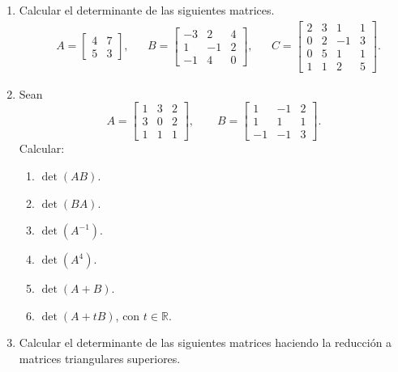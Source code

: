 \begin{enumerate}[topsep=6pt,itemsep=.4cm]
\item Calcular el determinante de las siguientes matrices.
    \begin{align*}
    &A=\begin{bmatrix} 4&7\\ 5&3\end{bmatrix},
    &&B=\begin{bmatrix} -3&2&4\\ 1&-1&2\\ -1&4&0\end{bmatrix},
    &&
    C=\begin{bmatrix} 2&3&1&1\\ 0&2&-1&3 \\ 0&5&1&1 \\1&1&2&5\end{bmatrix}.
    \end{align*}

    
\item Sean
        $$A=
    \begin{bmatrix}
        1&3&2 \\
        3&0&2 \\
        1&1&1
    \end{bmatrix}, \qquad
    B =
    \begin{bmatrix}
        1&-1&2\\
        1&1&1 \\
        -1&-1&3
    \end{bmatrix}.
    $$
    Calcular:
    \begin{multicols}{3}
    \begin{enumerate}
        \item $\det(AB)$.
        \item $\det(BA)$.
        \item $\det(A^{-1})$.
        \item $\det(A^{4})$.
        \item $\det(A+B)$.
        \item $\det(A+tB)$, con $t \in \mathbb{R}$.
    \end{enumerate}
\end{multicols}


\item Calcular el determinante de las siguientes matrices haciendo la reducción a matrices triangulares superiores.


\end{enumerate}
